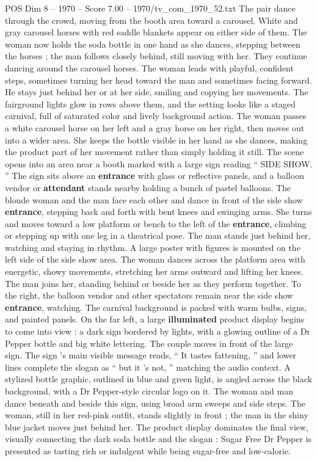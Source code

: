 \begin{textsample}{POS Dim 8 – 1970 – Score 7.00 – 1970/tv\_com\_1970\_52.txt}
The pair dance through the crowd, moving from the booth area toward a carousel.
White and gray carousel horses with red saddle blankets appear on either side of them.
The woman now holds the soda bottle in one hand as she dances, stepping between the horses ; the man follows closely behind, still moving with her.
They continue dancing around the carousel horses.
The woman leads with playful, confident steps, sometimes turning her head toward the man and sometimes facing forward.
He stays just behind her or at her side, smiling and copying her movements.
The fairground lights glow in rows above them, and the setting looks like a staged carnival, full of saturated color and lively background action.
The woman passes a white carousel horse on her left and a gray horse on her right, then moves out into a wider area.
She keeps the bottle visible in her hand as she dances, making the product part of her movement rather than simply holding it still.
The scene opens into an area near a booth marked with a large sign reading “ SIDE SHOW. ” The sign sits above an \textbf{entrance} with glass or reflective panels, and a balloon vendor or \textbf{attendant} stands nearby holding a bunch of pastel balloons.
The blonde woman and the man face each other and dance in front of the side show \textbf{entrance}, stepping back and forth with bent knees and swinging arms.
She turns and moves toward a low platform or bench to the left of the \textbf{entrance}, climbing or stepping up with one leg in a theatrical pose.
The man stands just behind her, watching and staying in rhythm.
A large poster with figures is mounted on the left side of the side show area.
The woman dances across the platform area with energetic, showy movements, stretching her arms outward and lifting her knees.
The man joins her, standing behind or beside her as they perform together.
To the right, the balloon vendor and other spectators remain near the side show \textbf{entrance}, watching.
The carnival background is packed with warm bulbs, signs, and painted panels.
On the far left, a large \textbf{illuminated} product display begins to come into view : a dark sign bordered by lights, with a glowing outline of a Dr Pepper bottle and big white lettering.
The couple moves in front of the large sign.
The sign ’s main visible message reads, “ It tastes fattening, ” and lower lines complete the slogan as “ but it ’s not, ” matching the audio context.
A stylized bottle graphic, outlined in blue and green light, is angled across the black background, with a Dr Pepper-style circular logo on it.
The woman and man dance beneath and beside this sign, using broad arm sweeps and side steps.
The woman, still in her red-pink outfit, stands slightly in front ; the man in the shiny blue jacket moves just behind her.
The product display dominates the final view, visually connecting the dark soda bottle and the slogan : Sugar Free Dr Pepper is presented as tasting rich or indulgent while being sugar-free and low-calorie.

\end{textsample}
